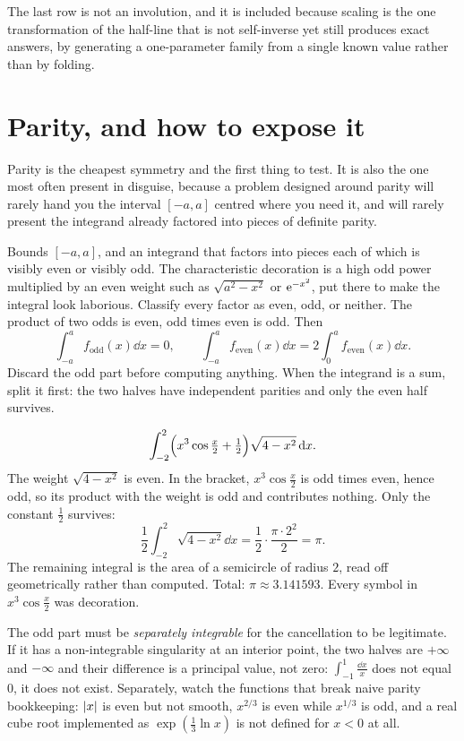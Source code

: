 The last row is not an involution, and it is included because scaling is the one transformation of the half-line that is not self-inverse yet still produces exact answers, by generating a one-parameter family from a single known value rather than by folding.

\section{Parity, and how to expose it}

Parity is the cheapest symmetry and the first thing to test. It is also the one most often present in disguise, because a problem designed around parity will rarely hand you the interval $[-a,a]$ centred where you need it, and will rarely present the integrand already factored into pieces of definite parity.

\cue Bounds $[-a,a]$, and an integrand that factors into pieces each of which is visibly even or visibly odd. The characteristic decoration is a high odd power multiplied by an even weight such as $\sqrt{a^{2}-x^{2}}$ or $\mathrm{e}^{-x^{2}}$, put there to make the integral look laborious.
\method Classify every factor as even, odd, or neither. The product of two odds is even, odd times even is odd. Then
\[\int_{-a}^{a}f_{\text{odd}}(x)\dd x=0,\qquad \int_{-a}^{a}f_{\text{even}}(x)\dd x=2\int_0^{a}f_{\text{even}}(x)\dd x.\]
Discard the odd part before computing anything. When the integrand is a sum, split it first: the two halves have independent parities and only the even half survives.

\begin{worked}
\[\int_{-2}^{2}\Bigl(x^{3}\cos\tfrac{x}{2}+\tfrac12\Bigr)\sqrt{4-x^{2}}\,\mathrm{d} x.\]
The weight $\sqrt{4-x^{2}}$ is even. In the bracket, $x^{3}\cos\tfrac x2$ is odd times even, hence odd, so its product with the weight is odd and contributes nothing. Only the constant $\tfrac12$ survives:
\[\frac12\int_{-2}^{2}\sqrt{4-x^{2}}\dd x=\frac12\cdot\frac{\pi\cdot2^{2}}{2}=\pi.\]
The remaining integral is the area of a semicircle of radius $2$, read off geometrically rather than computed. Total: $\pi\approx3.141593$. Every symbol in $x^{3}\cos\tfrac x2$ was decoration.
\end{worked}

\begin{trap}
The odd part must be \emph{separately integrable} for the cancellation to be legitimate. If it has a non-integrable singularity at an interior point, the two halves are $+\infty$ and $-\infty$ and their difference is a principal value, not zero: $\int_{-1}^{1}\tfrac{\dd x}{x}$ does not equal $0$, it does not exist. Separately, watch the functions that break naive parity bookkeeping: $\left\lvert x\right\rvert$ is even but not smooth, $x^{2/3}$ is even while $x^{1/3}$ is odd, and a real cube root implemented as $\exp(\tfrac13\ln x)$ is not defined for $x<0$ at all.
\end{trap}

